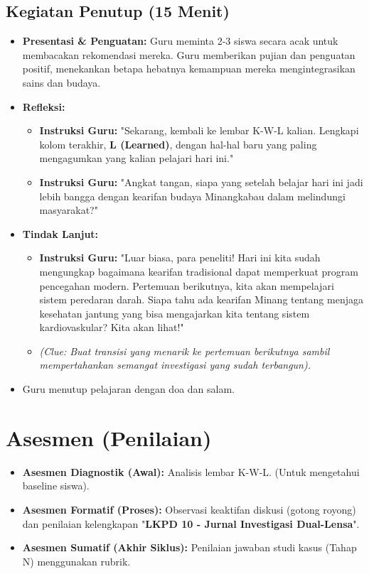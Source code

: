 \documentclass[a4paper,12pt]{article}
\begin{document}
\subsection{Kegiatan Penutup (15 Menit)}
\begin{itemize}
\item \textbf{Presentasi \& Penguatan:} Guru meminta 2-3 siswa secara acak untuk membacakan rekomendasi mereka. Guru memberikan pujian dan penguatan positif, menekankan betapa hebatnya kemampuan mereka mengintegrasikan sains dan budaya.
\item \textbf{Refleksi:}
    \begin{itemize}
    \item \textbf{Instruksi Guru:} "Sekarang, kembali ke lembar K-W-L kalian. Lengkapi kolom terakhir, \textbf{L (Learned)}, dengan hal-hal baru yang paling mengagumkan yang kalian pelajari hari ini."
    \item \textbf{Instruksi Guru:} "Angkat tangan, siapa yang setelah belajar hari ini jadi lebih bangga dengan kearifan budaya Minangkabau dalam melindungi masyarakat?"
    \end{itemize}
\item \textbf{Tindak Lanjut:}
    \begin{itemize}
    \item \textbf{Instruksi Guru:} "Luar biasa, para peneliti! Hari ini kita sudah mengungkap bagaimana kearifan tradisional dapat memperkuat program pencegahan modern. Pertemuan berikutnya, kita akan mempelajari sistem peredaran darah. Siapa tahu ada kearifan Minang tentang menjaga kesehatan jantung yang bisa mengajarkan kita tentang sistem kardiovaskular? Kita akan lihat!"
    \item \textit{(Clue: Buat transisi yang menarik ke pertemuan berikutnya sambil mempertahankan semangat investigasi yang sudah terbangun).}
    \end{itemize}
\item Guru menutup pelajaran dengan doa dan salam.
\end{itemize}

\section{Asesmen (Penilaian)}

\begin{itemize}
\item \textbf{Asesmen Diagnostik (Awal):} Analisis lembar K-W-L. (Untuk mengetahui baseline siswa).
\item \textbf{Asesmen Formatif (Proses):} Observasi keaktifan diskusi (gotong royong) dan penilaian kelengkapan "\textbf{LKPD 10 - Jurnal Investigasi Dual-Lensa}".
\item \textbf{Asesmen Sumatif (Akhir Siklus):} Penilaian jawaban studi kasus (Tahap N) menggunakan rubrik.
\end{itemize}
\end{document}
